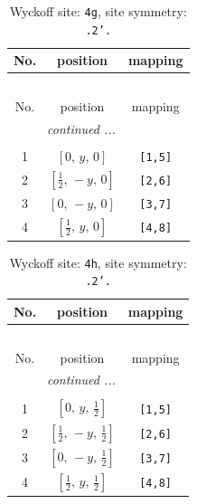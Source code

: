 \documentclass[fleqn,8pt]{jsarticle}
\begin{document}
\begin{longtable}{ccc}
\caption{Wyckoff site: {\tt 4g}, site symmetry: {\tt .2'.}}
 \\
 \hline \hline
No. & position & mapping \\ \hline \endfirsthead

\multicolumn{2}{l}{\tablename\ \thetable{}} \\
 \hline \hline
No. & position & mapping \\ \hline \endhead

 \hline \hline
\multicolumn{2}{r}{\footnotesize\it continued ...} \\ \endfoot

 \hline \hline
\multicolumn{2}{r}{} \\ \endlastfoot

1 & $\left[ 0,\, y,\, 0 \right]$ & {\tt [1,5]} \\ \hline
2 & $\left[ \frac{1}{2},\, - y,\, 0 \right]$ & {\tt [2,6]} \\ \hline
3 & $\left[ 0,\, - y,\, 0 \right]$ & {\tt [3,7]} \\ \hline
4 & $\left[ \frac{1}{2},\, y,\, 0 \right]$ & {\tt [4,8]} \\
\end{longtable}
\renewcommand{\arraystretch}{1.2}
\begin{longtable}{ccc}
\caption{Wyckoff site: {\tt 4h}, site symmetry: {\tt .2'.}}
 \\
 \hline \hline
No. & position & mapping \\ \hline \endfirsthead

\multicolumn{2}{l}{\tablename\ \thetable{}} \\
 \hline \hline
No. & position & mapping \\ \hline \endhead

 \hline \hline
\multicolumn{2}{r}{\footnotesize\it continued ...} \\ \endfoot

 \hline \hline
\multicolumn{2}{r}{} \\ \endlastfoot

1 & $\left[ 0,\, y,\, \frac{1}{2} \right]$ & {\tt [1,5]} \\ \hline
2 & $\left[ \frac{1}{2},\, - y,\, \frac{1}{2} \right]$ & {\tt [2,6]} \\ \hline
3 & $\left[ 0,\, - y,\, \frac{1}{2} \right]$ & {\tt [3,7]} \\ \hline
4 & $\left[ \frac{1}{2},\, y,\, \frac{1}{2} \right]$ & {\tt [4,8]} \\
\end{longtable}
\end{document}
